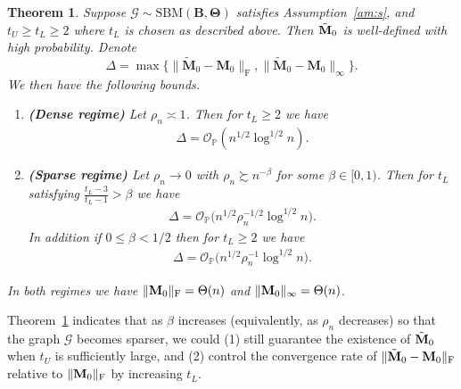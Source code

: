 \documentclass[10pt,journal,compsoc]{IEEEtran}
\newcommand{\op}{\mathcal{O}_{\mathbb{P}}}
\newcommand{\ee}{\end{aligned} \end{equation}}
\newcommand{\bds}{\boldsymbol}
\newtheorem{theorem}{Theorem}
\newtheorem{A}{Assumption}
\newcommand{\bee}{\begin{equation}\begin{aligned}}
\newcommand{\M}[1]{{{\mathbf{\MakeUppercase{#1}}}}}
\newcommand{\F}{\mathrm{F}}
\numberwithin{equation}{section}
\begin{document}
\begin{theorem}\label{T3}
Suppose $\mathcal{G}\sim \mathrm{SBM}(\mathbf{B},
  \bm{\Theta})$ satisfies Assumption~\ref{am:s}, and $t_U\geq t_L \geq 2$ where $t_L$ is chosen as described above. Then
$\tilde{\M M}_0$ is well-defined with high probability. Denote 
$$\Delta = \max\{\|\tilde{\mathbf{M}}_0 - \mathbf{M}_0\|_{\F}, \|\tilde{\mathbf{M}}_0 - \mathbf{M}_0 \|_{\infty}\}.$$
We then have the following bounds.
\begin{enumerate}
    \item \textbf{(Dense regime)} Let $\rho_n\asymp 1$. 
    Then for $t_L \geq 2$ we have \bee\label{T3:dense}
    \Delta = \mathcal{O}_{\mathbb{P}}(n^{1/2}\log^{1/2}{n}).
\ee
    \item \textbf{(Sparse regime)} Let $\rho_n\rightarrow 0$ with $\rho_n \succsim n^{-\beta}$ for some $\beta \in [0,1)$. Then for $t_L$ satisfying $\tfrac{t_L - 3}{t_L - 1} > \beta$ we have
    \bee\label{T3:e}
     \Delta = \op\big(n^{1/2}\rho_n^{-1/2} \log^{1/2}{n} \big).
    \ee
    In addition if $0 \leq \beta < 1/2$ then for $t_L \geq 2$ we have
    \bee\Delta = \op\big(n^{1/2}\rho_n^{-1} \log^{1/2}{n}\big).
 \ee
\end{enumerate}
In both regimes we have $\|\M M_0\|_{\F} = \Theta(n)$ and 
$\|\M M_0\|_{\infty} = \Theta(n)$.
\end{theorem}
Theorem~\ref{T3} indicates that as $\beta$ increases
(equivalently, as $\rho_n$ decreases) so that the graph $\mathcal{G}$
becomes sparser, we could (1) still guarantee the existence of $\tilde{\M M}_0$ when
 $t_U$ is sufficiently large, and (2) control the convergence rate of
$\|\tilde{\M M}_0 - {\M M}_0\|_{\F}$ relative to $\|\M M_0\|_{\F}$ by increasing $t_L$.
\end{document}
